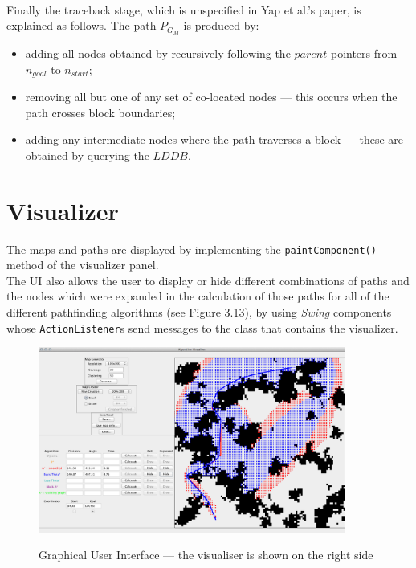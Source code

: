 \documentclass[12pt,notitlepage]{report}
\begin{document}
\\
\noindent
Finally the traceback stage, which is unspecified in Yap et al.'s paper, is explained as follows. The path $P_{G_{M}}$ is produced by:
\begin{itemize}
\item adding all nodes obtained by recursively following the $parent$ pointers from $n_{goal}$ to $n_{start}$;
\item removing all but one of any set of co-located nodes --- this occurs when the path crosses block boundaries;
\item adding any intermediate nodes where the path traverses a block --- these are obtained by querying the $LDDB$.
\end{itemize}
 
\section{Visualizer}

The maps and paths are displayed by implementing the {\tt paintComponent()} method of the visualizer panel.\\

\noindent The UI also allows the user to display or hide different combinations of paths and the nodes which were expanded in the calculation of those paths for all of the different pathfinding algorithms (see Figure 3.13), by using {\em Swing} components whose {\tt ActionListener}s send messages to the class that contains the visualizer.

\begin{figure}
\centering
  {\includegraphics[width=0.9\textwidth]{gui.png}}
  \caption[Graphical user interface]{Graphical User Interface --- the visualiser is shown on the right side} 
\end{figure}
\end{document}
